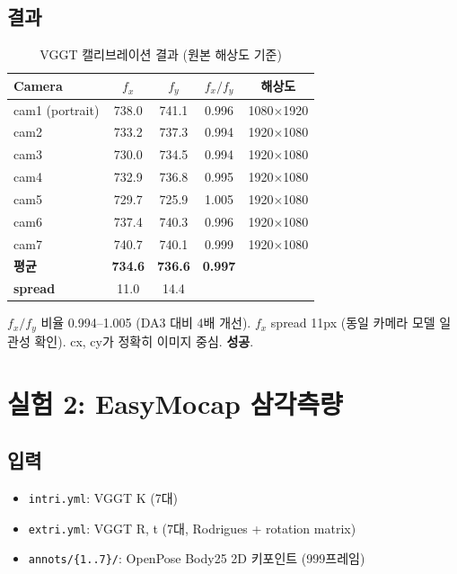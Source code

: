 \documentclass[11pt, a4paper]{report}
\begin{document}
\section{결과}

\begin{table}[H]
\centering
\caption{VGGT 캘리브레이션 결과 (원본 해상도 기준)}
\renewcommand{\arraystretch}{1.3}
\begin{tabular}{l cc cc}
\toprule
\textbf{Camera} & $f_x$ & $f_y$ & $f_x/f_y$ & \textbf{해상도} \\
\midrule
cam1 (portrait) & 738.0 & 741.1 & 0.996 & 1080$\times$1920 \\
cam2 & 733.2 & 737.3 & 0.994 & 1920$\times$1080 \\
cam3 & 730.0 & 734.5 & 0.994 & 1920$\times$1080 \\
cam4 & 732.9 & 736.8 & 0.995 & 1920$\times$1080 \\
cam5 & 729.7 & 725.9 & 1.005 & 1920$\times$1080 \\
cam6 & 737.4 & 740.3 & 0.996 & 1920$\times$1080 \\
cam7 & 740.7 & 740.1 & 0.999 & 1920$\times$1080 \\
\midrule
\textbf{평균} & \textbf{734.6} & \textbf{736.6} & \textbf{0.997} & \\
\textbf{spread} & 11.0 & 14.4 & & \\
\bottomrule
\end{tabular}
\end{table}

\begin{summary}
$f_x/f_y$ 비율 0.994--1.005 (DA3 대비 4배 개선). $f_x$ spread 11px (동일 카메라 모델 일관성 확인). cx, cy가 정확히 이미지 중심. \textcolor{thmgreen}{\textbf{성공}}.
\end{summary}


\chapter{실험 2: EasyMocap 삼각측량}

\section{입력}
\begin{itemize}[leftmargin=*]
  \item \texttt{intri.yml}: VGGT K (7대)
  \item \texttt{extri.yml}: VGGT R, t (7대, Rodrigues + rotation matrix)
  \item \texttt{annots/\{1..7\}/}: OpenPose Body25 2D 키포인트 (999프레임)
\end{itemize}
\end{document}
